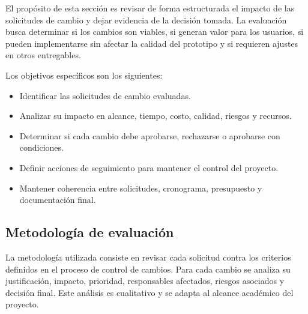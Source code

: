 \documentclass[11pt,spanish]{article}
\begin{document}
El propósito de esta sección es revisar de forma estructurada el impacto de las solicitudes de cambio y dejar evidencia de la decisión tomada. La evaluación busca determinar si los cambios son viables, si generan valor para los usuarios, si pueden implementarse sin afectar la calidad del prototipo y si requieren ajustes en otros entregables.

Los objetivos específicos son los siguientes:

\begin{itemize}[leftmargin=*, label={\textbullet}]
    \item Identificar las solicitudes de cambio evaluadas.
    \item Analizar su impacto en alcance, tiempo, costo, calidad, riesgos y recursos.
    \item Determinar si cada cambio debe aprobarse, rechazarse o aprobarse con condiciones.
    \item Definir acciones de seguimiento para mantener el control del proyecto.
    \item Mantener coherencia entre solicitudes, cronograma, presupuesto y documentación final.
\end{itemize}

\subsection{Metodología de evaluación}

La metodología utilizada consiste en revisar cada solicitud contra los criterios definidos en el proceso de control de cambios. Para cada cambio se analiza su justificación, impacto, prioridad, responsables afectados, riesgos asociados y decisión final. Este análisis es cualitativo y se adapta al alcance académico del proyecto.
\end{document}
